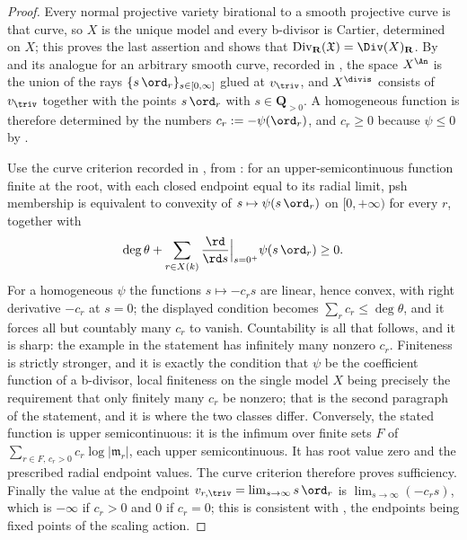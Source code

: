 \begin{proof}
Every normal projective variety birational to a smooth projective curve is
that curve, so $X$ is the unique model and every b-divisor is Cartier,
determined on $X$; this proves the last assertion and shows that
$\operatorname{Div}_{\mathbf R}(\mathfrak X)=\Div(X)_{\mathbf R}$.  By
 and its analogue for an arbitrary smooth curve,
recorded in , the space
$X^{\An}$ is the union of the rays $\{s\,\ord_r\}_{s\in[0,\infty]}$ glued
at $v_{\triv}$, and $X^{\divis}$ consists of $v_{\triv}$ together with
the points $s\,\ord_r$ with $s\in\mathbf Q_{>0}$.  A homogeneous
function is therefore determined by the numbers
$c_r:=-\psi(\ord_r)$, and $c_r\geq0$ because
$\psi\leq0$ by .

Use the curve criterion recorded in , from
\cite[Example~4.13 and Proposition~4.12]{BJ22}: for an upper-semicontinuous
function finite at the root, with each closed endpoint equal to its radial
limit, psh membership is equivalent to convexity of
$s\mapsto\psi(s\,\ord_r)$ on $[0,+\infty)$ for every $r$, together with
\[
 \deg\theta+\sum_{r\in X(k)}\frac{\rd}{\rd s}\Big|_{s=0^+}\psi(s\,\ord_r)
 \geq0 .
\]
For a homogeneous $\psi$ the functions $s\mapsto-c_rs$ are linear, hence
convex, with right derivative $-c_r$ at $s=0$; the displayed condition
becomes $\sum_rc_r\leq\deg\theta$, and it forces all but countably many
$c_r$ to vanish.  Countability is all that follows, and it is sharp: the
example in the statement has infinitely many nonzero $c_r$.  Finiteness is
strictly stronger, and it is exactly the condition that $\psi$ be the
coefficient function of a b-divisor, local finiteness on the single model
$X$ being precisely the requirement that only finitely many $c_r$ be
nonzero; that is the second paragraph of the statement, and it is where the
two classes differ.  Conversely, the stated function is upper semicontinuous: it is the
infimum over finite sets $F$ of
$\sum_{r\in F,\,c_r>0}c_r\log|\mathfrak m_r|$, each upper
semicontinuous. It has root value zero and the prescribed radial endpoint
values. The curve criterion therefore proves sufficiency. Finally the value at the endpoint
$v_{r,\triv}=\lim_{s\to\infty}s\,\ord_r$ is
$\lim_{s\to\infty}(-c_rs)$, which is $-\infty$ if $c_r>0$ and $0$ if
$c_r=0$; this is consistent with
, the endpoints being fixed points
of the scaling action.
\end{proof}

